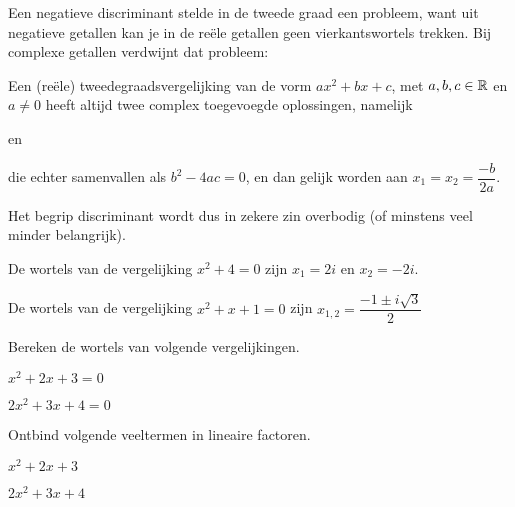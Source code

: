 \documentclass{ximera}
\begin{document}
    Een negatieve discriminant stelde in de tweede graad een probleem, want uit negatieve getallen kan je in de reële getallen geen vierkantswortels trekken.
    Bij complexe getallen verdwijnt dat probleem:

    \begin{proposition}\nl

        Een (reële) tweedegraadsvergelijking van de vorm $ax^2+bx+c$, met $a,b,c\in\mathbb{R}$ en $a\neq0$
        heeft altijd twee complex toegevoegde oplossingen, namelijk 
        \begin{center}
             en 
        \end{center}
        die echter samenvallen als $b^2-4ac=0$, en dan gelijk worden aan $x_1=x_2=\dfrac{-b}{2a}$.
    \end{proposition}
    Het begrip discriminant wordt dus in zekere zin overbodig (of minstens veel minder belangrijk).


    \begin{example} 
        \begin{question} De wortels van de vergelijking $x^2+4=0$ zijn $x_1=2i$ en $x_2=-2i$.\end{question}
        \begin{question} De wortels van de vergelijking $x^2+x+1=0$ zijn $x_{1,2}=\dfrac{-1\pm i\sqrt{3}}{2}$\end{question}
    \end{example}

    \begin{exercise} Bereken de wortels van volgende vergelijkingen.
        \begin{question} $x^2+2x+3=0$\end{question}
        \begin{question} $2x^2+3x+4=0$\end{question}
    \end{exercise}

    \begin{exercise} Ontbind volgende veeltermen in lineaire factoren.
        \begin{question} $x^2+2x+3$\end{question}
        \begin{question} $2x^2+3x+4$\end{question}
    \end{exercise}
\end{document}
